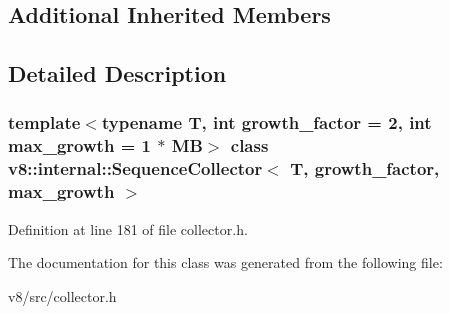 \subsection*{Additional Inherited Members}


\subsection{Detailed Description}
\subsubsection*{template$<$typename T, int growth\+\_\+factor = 2, int max\+\_\+growth = 1 $\ast$ MB$>$\newline
class v8\+::internal\+::\+Sequence\+Collector$<$ T, growth\+\_\+factor, max\+\_\+growth $>$}



Definition at line 181 of file collector.\+h.



The documentation for this class was generated from the following file\+:\begin{DoxyCompactItemize}
\item 
v8/src/collector.\+h\end{DoxyCompactItemize}
